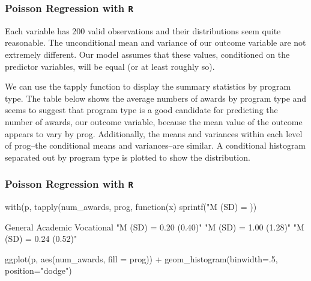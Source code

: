 \documentclass[00-GLMregslides.tex]{subfiles}
\begin{document}
\begin{frame}[fragile]

\frametitle{Poisson Regression with \texttt{R}}
\Large
Each variable has 200 valid observations and their distributions seem quite reasonable. The unconditional mean and variance of our outcome variable are not extremely different. Our model assumes that these values, conditioned on the predictor variables, will be equal (or at least roughly so).

We can use the tapply function to display the summary statistics by program type. The table below shows the average numbers of awards by program type and seems to suggest that program type is a good candidate for predicting the number of awards, our outcome variable, because the mean value of the outcome appears to vary by prog. Additionally, the means and variances within each level of prog--the conditional means and variances--are similar. A conditional histogram separated out by program type is plotted to show the distribution.

\end{frame}

\begin{frame}[fragile]

\frametitle{Poisson Regression with \texttt{R}}
\Large

with(p, tapply(num_awards, prog, function(x) {
  sprintf("M (SD) = %
}))
 
                General               Academic             Vocational 
 "M (SD) = 0.20 (0.40)" "M (SD) = 1.00 (1.28)" "M (SD) = 0.24 (0.52)"
 
ggplot(p, aes(num_awards, fill = prog)) +
  geom_histogram(binwidth=.5, position="dodge")
 \end{frame}
		
		
\end{document}
